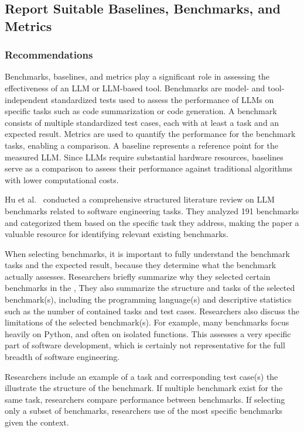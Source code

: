 



\subsection{Report Suitable Baselines, Benchmarks, and Metrics}

\subsubsection{Recommendations}

Benchmarks, baselines, and metrics play a significant role in assessing the effectiveness of an LLM or LLM-based tool.
Benchmarks are model- and tool-independent standardized tests used to assess the performance of LLMs on specific tasks such as code summarization or code generation.
A benchmark consists of multiple standardized test cases, each with at least a task and an expected result.
Metrics are used to quantify the performance for the benchmark tasks, enabling a comparison.
A baseline represents a reference point for the measured LLM.
Since LLMs require substantial hardware resources, baselines serve as a comparison to assess their performance against traditional algorithms with lower computational costs.

Hu et al.~\citet{hu2025assessingadvancingbenchmarksevaluating} conducted a comprehensive structured literature review on LLM benchmarks related to software engineering tasks.
They analyzed 191 benchmarks and categorized them based on the specific task they address, making the paper a valuable resource for identifying relevant existing benchmarks.

When selecting benchmarks, it is important to fully understand the benchmark tasks and the expected result, because they determine what the benchmark actually assesses.
Researchers \must briefly summarize why they selected certain benchmarks in the \paper, 
They \should also summarize the structure and tasks of the selected benchmark(s), including the programming language(s) and descriptive statistics such as the number of contained tasks and test cases.
Researchers \should also discuss the limitations of the selected benchmark(s).
For example, many benchmarks focus heavily on Python, and often on isolated functions.
This assesses a very specific part of software development, which is certainly not representative for the full breadth of software engineering.

Researchers \may include an example of a task and corresponding test case(s) the illustrate the structure of the benchmark.
If multiple benchmark exist for the same task, researchers \should compare performance between benchmarks.
If selecting only a subset of benchmarks, researchers \should use of the most specific benchmarks given the context.

